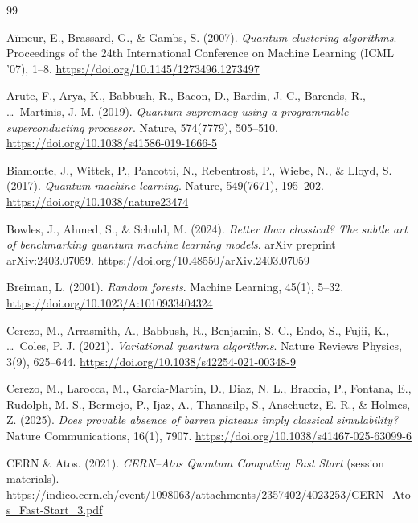 \begin{thebibliography}{99}

	A\"imeur, E., Brassard, G., \& Gambs, S. (2007).
	\emph{Quantum clustering algorithms}.
	Proceedings of the 24th International Conference on Machine Learning (ICML '07), 1--8.
	\url{https://doi.org/10.1145/1273496.1273497}

	Arute, F., Arya, K., Babbush, R., Bacon, D., Bardin, J. C., Barends, R., \ldots\ Martinis, J. M. (2019).
	\emph{Quantum supremacy using a programmable superconducting processor}.
	Nature, 574(7779), 505--510.
	\url{https://doi.org/10.1038/s41586-019-1666-5}

	Biamonte, J., Wittek, P., Pancotti, N., Rebentrost, P., Wiebe, N., \& Lloyd, S. (2017).
	\emph{Quantum machine learning}.
	Nature, 549(7671), 195--202.
	\url{https://doi.org/10.1038/nature23474}

	Bowles, J., Ahmed, S., \& Schuld, M. (2024).
	\emph{Better than classical? The subtle art of benchmarking quantum machine learning models}.
	arXiv preprint arXiv:2403.07059.
	\url{https://doi.org/10.48550/arXiv.2403.07059}

	Breiman, L. (2001).
	\emph{Random forests}.
	Machine Learning, 45(1), 5--32.
	\url{https://doi.org/10.1023/A:1010933404324}

	Cerezo, M., Arrasmith, A., Babbush, R., Benjamin, S. C., Endo, S., Fujii, K., \ldots\ Coles, P. J. (2021).
	\emph{Variational quantum algorithms}.
	Nature Reviews Physics, 3(9), 625--644.
	\url{https://doi.org/10.1038/s42254-021-00348-9}

	Cerezo, M., Larocca, M., Garc\'ia-Mart\'in, D., Diaz, N. L., Braccia, P., Fontana, E., Rudolph, M. S., Bermejo, P., Ijaz, A., Thanasilp, S., Anschuetz, E. R., \& Holmes, Z. (2025).
	\emph{Does provable absence of barren plateaus imply classical simulability?}
	Nature Communications, 16(1), 7907.
	\url{https://doi.org/10.1038/s41467-025-63099-6}

	CERN \& Atos. (2021).
	\emph{CERN--Atos Quantum Computing Fast Start} (session materials).
	\url{https://indico.cern.ch/event/1098063/attachments/2357402/4023253/CERN_Atos_Fast-Start_3.pdf}


\end{thebibliography}
